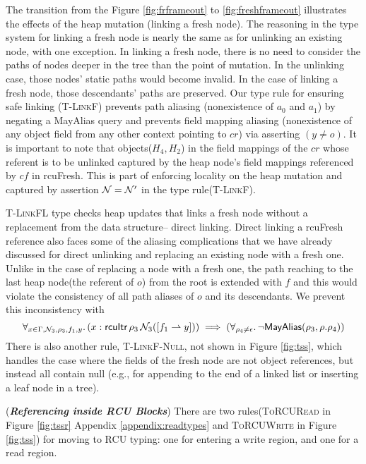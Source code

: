 The transition from the Figure \ref{fig:frframeout} to \ref{fig:freshframeout} illustrates the effects of the heap mutation (linking a fresh node). The reasoning in the type system for linking a fresh node is nearly the same as for unlinking an existing node, with one exception.
In linking a fresh node, there is no need to consider the paths of nodes deeper in the tree than the point of mutation.  In the unlinking case, those nodes' static paths would become invalid.  In the case of linking a fresh node, those descendants' paths are preserved.
Our type rule for ensuring safe linking (\textsc{T-LinkF}) prevents path aliasing (nonexistence of $a_0$ and $a_1$) by negating a \textsf{MayAlias} query and prevents field mapping aliasing (nonexistence of any object field from any other context pointing to $cr$) via asserting $(y\neq o)$. It is important to note that objects($H_4,H_2$) in the field mappings of the $cr$ whose referent is to be unlinked captured by the heap node's field mappings referenced by $cf$ in \textsf{rcuFresh}. This is part of enforcing locality on the heap mutation and captured by assertion $\mathcal{N} = \mathcal{N}'$ in the type rule(\textsc{T-LinkF}). 

\textsc{T-LinkFL} type checks heap updates that links a fresh node without a replacement from the data structure-- direct linking. Direct linking a \textsf{rcuFresh} reference also faces some of the aliasing complications that we have already discussed for direct unlinking and replacing an existing node with a fresh one. Unlike in the case of replacing a node with a fresh one, the path reaching to the last heap node(the referent of $o$) from the root is extended with $f$ and this would violate the consistency of all path aliases of $o$ and its descendants. We prevent this inconsistency with
\[
\forall_{x \in \Gamma, \mathcal{N}_3, \rho_3,f_1,y} \ldotp (x:\textsf{rcuItr}\,\rho_3\,\mathcal{N}_3([f_1 \rightharpoonup y])) \implies
 (\forall_{\rho_4\neq \epsilon} \ldotp \neg\mathsf{MayAlias}(\rho_3, \rho.\rho_4) )
\]
There is also another rule, \textsc{T-LinkF-Null}, not shown in Figure \ref{fig:tss}, which handles the case where the fields of the fresh node are not object references, but instead all contain null (e.g., for appending to the end of a linked list or inserting a leaf node in a tree).

(\textit{\textbf{Referencing inside \textsf{RCU} Blocks}})
There are two rules(\textsc{ToRCURead} in Figure \ref{fig:tssr} Appendix \ref{appendix:readtypes} and \textsc{ToRCUWrite} in Figure \ref{fig:tss}) for moving to \textsf{RCU} typing: one for entering a write region, and one for a read region.
